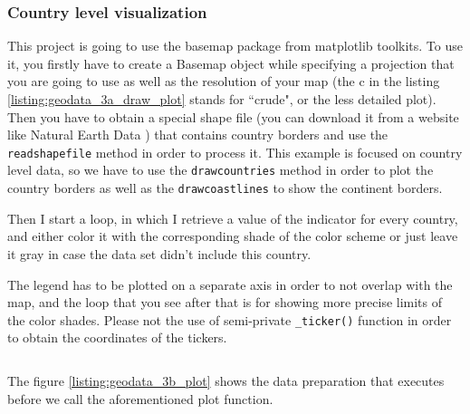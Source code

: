 \documentclass[12pt, a4paper]{article}
\begin{document}
\bgroup
  \inputminted[linenos, breaklines=true, fontsize=\scriptsize, firstnumber=last]{python}{src/geo/map/2_duplicate_columns.py}
  \label{listing:geodata_2_duplicate_columns}
\egroup

\subsubsection{Country level visualization}

This project is going to use the basemap package from matplotlib toolkits.
To use it, you firstly have to create a Basemap object while specifying a projection that you are going to use as well as the resolution of your map (the c in the listing \ref{listing:geodata_3a_draw_plot} stands for ``crude", or the less detailed plot). Then you have to obtain a special shape file (you can download it from a website like Natural Earth Data \cite{naturalearthdata}) that contains country borders and use the \texttt{readshapefile} method in order to process it. This example is focused on country level data, so we have to use the \texttt{drawcountries} method in order to plot the country borders as well as the \texttt{drawcoastlines} to show the continent borders.

Then I start a loop, in which I retrieve a value of the indicator for every country, and either color it with the corresponding shade of the color scheme or just leave it gray in case the data set didn't include this country.

The legend has to be plotted on a separate axis in order to not overlap with the map, and the loop that you see after that is for showing more precise limits of the color shades. Please not the use of semi-private \texttt{\_ticker()} function in order to obtain the coordinates of the tickers.

\bgroup
  \inputminted[linenos, breaklines=true, fontsize=\scriptsize, firstnumber=last]{python}{src/geo/map/3a_draw_plot.py}
  \label{listing:geodata_3a_draw_plot}
\egroup

The figure \ref{listing:geodata_3b_plot} shows the data preparation that executes before we call the aforementioned plot function.

\bgroup
  \inputminted[linenos, breaklines=true, fontsize=\scriptsize, firstnumber=last]{python}{src/geo/map/3b_plot.py}
  \label{listing:geodata_3b_plot}
\egroup
\end{document}
